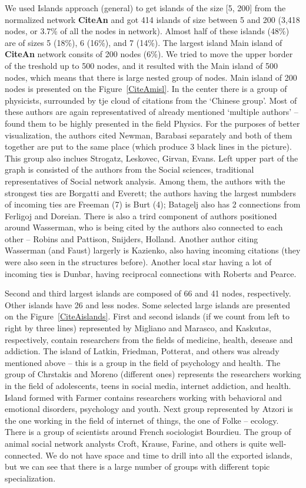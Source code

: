 \documentclass[11pt]{article} %
\begin{document}
We used Islands approach (general) to get islands of the size [5, 200] from the normalized network \textbf{CiteAn} and got 414 islands of size between 5 and 200 (3,418 nodes, or 3.7\% of all the nodes in network). Almost half of these islands (48\%) are of sizes 5 (18\%), 6 (16\%), and 7 (14\%). The largest island Main island of \textbf{CiteAn} network consits of 200 nodes (6\%). We tried to move the upper border of the treshold up to 500 nodes, and it resulted with the Main island of 500 nodes, which means that there is large nested group of nodes. Main island of 200 nodes is presented on the Figure~\ref{CiteAmisl}. In the center there is a group of physicists, surrounded by tje cloud of citations from the `Chinese group'. Most of these authors are again representatived of already mentioned `multiple authors' -- \cite{harzing2015} found them to be highly presented in the field Physics. For the purposes of better visualization, the authors cited Newman, Barabasi separately and both of them together are put to the same place (which produce 3 black lines in the picture). This group also inclues Strogatz, Leskovec, Girvan, Evans.  Left upper part of the graph is consisted of the authors from the Social sciences, traditional representatives of Social network analysis. Among them, the authors with the strongest ties are Borgatti and Everett; the authors having the largest numbders of incoming ties are Freeman (7) is Burt (4); Batagelj also has 2 connections from Ferligoj and Doreian. There is also a trird component of authors positioned around Wasserman, who is being cited by the authors also connected to each other -- Robins and Pattison, Snijders, Holland. Another author citing Wasserman (and Faust) largerly is Kazienko, also having incoming citations (they were also seen in the structures before). Another local star having a lot of incoming ties is Dunbar, having reciprocal connections with Roberts and Pearce. \medskip 

Second and third largest islands are composed of 66 and 41 nodes, respectively. Other islands have  26 and less nodes. Some selected large islands are presented on the Figure~\ref{CiteAislands}. First and second islands (if we count from left to right by three lines) represented by Migliano and Marasco, and Kaskutas, respectively, contain researchers from the fields of medicine, health, desease and addiction. The island of Latkin, Friedman, Potterat, and others was already mentioned above -- this is a group in the field of psychology and health. The group of Chrstakis and Moreno (different ones) represents the researchers working in the field of adolescents, teens in social media, internet addiction, and health. Island formed with Farmer contains researchers working with behavioral and emotional disorders, psychology and youth. Next group represented by Atzori is the one working in the field of internet of things, the one of Folke -- ecology. There is a group of scientists around French sociologist Bourdieu. The group of animal social network analysts Croft, Krause, Farine, and others is quite well-connected. We do not have space and time to drill into all the exported islands, but we can see that there is a large number of groups with different topic specialization. \medskip 
\end{document}
